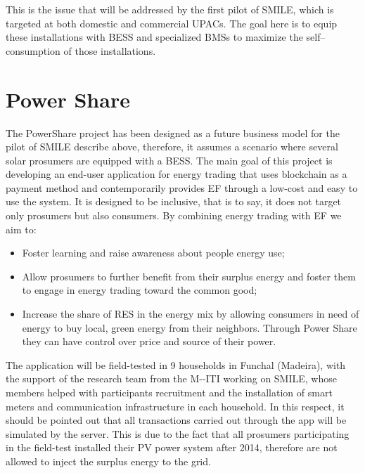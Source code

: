 This is the issue that will be addressed by the first pilot of \ac{SMILE}, which is targeted at both domestic and commercial \acp{UPAC}. The goal here is to equip these installations with BESS and specialized \acp{BMS} to maximize the self--consumption of those installations.


\section{Power Share}
The PowerShare project has been designed as a future business model for the pilot of \ac{SMILE} describe above, therefore, it assumes a scenario where several solar prosumers are equipped with a \ac{BESS}.
The main goal of this project is developing an end-user application for energy trading that uses blockchain as a payment method and contemporarily provides \ac{EF} through a low-cost and easy to use the system. It is designed to be inclusive, that is to say, it does not target only prosumers but also consumers. By combining energy trading with \ac{EF} we aim to:

\begin{itemize}
\item Foster learning and raise awareness about people energy use;
\item Allow prosumers to further benefit from their surplus energy and foster them to engage in energy trading toward the common good;
\item Increase the share of RES in the energy mix by allowing consumers in need of energy to buy local, green energy from their neighbors. Through Power Share they can have control over price and source of their power.
\end{itemize}


The application will be field-tested in 9 households in Funchal (Madeira), with the support of the research team from the \ac{M--ITI} working on SMILE, whose members helped with participants recruitment and the installation of smart meters and communication infrastructure in each household.
In this respect, it should be pointed out that all transactions carried out through the app will be simulated by the server. This is due to the fact that all prosumers participating in the field-test installed their \ac{PV} power system after 2014, therefore are not allowed to inject the surplus energy to the grid.



